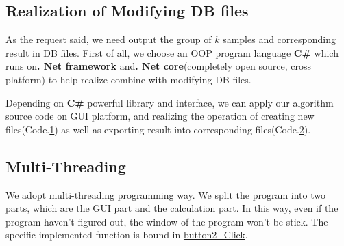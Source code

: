 \subsection{Realization of Modifying DB files}

As the request said, we need output the group of $k$ samples and corresponding result in DB files.
First of all, we choose an OOP program language \textbf{C\#} 
which runs on\textbf{. Net framework} and\textbf{. Net core}(completely open source, cross platform) 
to help realize combine with modifying DB files.

Depending on \textbf{C\#} powerful library and interface, we can apply our algorithm source code on GUI platform,
and realizing the operation of creating new files(Code.\hyperref[code:create]{1}) 
as well as exporting result into corresponding files(Code.\hyperref[code:insert]{2}).  
\label{code:create}
\label{code:insert}

\subsection{Multi-Threading}
    
We adopt multi-threading programming way. We split the program into two parts, which are the GUI part and the 
calculation part. In this way, even if the program haven't figured out, the window of the program won't be stick.
The specific implemented function is bound in \hyperref[code:multi]{button2\_Click}.
\label{code:multi}

    
